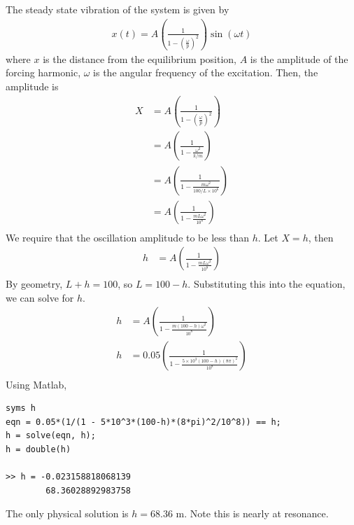 \subsection{}
The steady state vibration of the system is given by
\begin{align*}
    x(t) = A\left(\frac{1}{1 - \left(\frac{\omega}{p}\right)^2}\right)\sin(\omega t)
\end{align*}
where $x$ is the distance from the equilibrium position, $A$ is the amplitude of the forcing harmonic, $\omega$ is the angular frequency of the excitation. Then, the amplitude is 
\begin{align*}
    X &= A \left(\frac{1}{1 - \left(\frac{\omega}{p}\right)^2}\right) \\
    &= A \left(\frac{1}{1 - \frac{\omega^2}{k/m}}\right) \\
    &= A \left(\frac{1}{1 - \frac{m \omega^2}{100/L \times 10^6}}\right) \\
    &= A \left(\frac{1}{1 - \frac{mL \omega^2}{10^8}}\right) \\
\end{align*}
We require that the oscillation amplitude to be less than $h$. Let $X = h$, then
\begin{align*}
    h &= A \left(\frac{1}{1 - \frac{mL \omega^2}{10^8}}\right) \\
\end{align*}
By geometry, $L+h = 100$, so $L = 100 - h$. Substituting this into the equation, we can solve for $h$.
\begin{align*}
    h &= A \left(\frac{1}{1 - \frac{m(100-h) \omega^2}{10^8}}\right) \\
    h &= 0.05 \left(\frac{1}{1 - \frac{5\times 10^3(100-h)(8\pi)^2}{10^8}}\right) \\
\end{align*}
Using Matlab, 
\begin{verbatim}
syms h
eqn = 0.05*(1/(1 - 5*10^3*(100-h)*(8*pi)^2/10^8)) == h;
h = solve(eqn, h);
h = double(h)

>> h = -0.023158818068139
        68.36028892983758
\end{verbatim}
The only physical solution is $\boxed{h = 68.36 \text{ m}}$. Note this is nearly at resonance.

